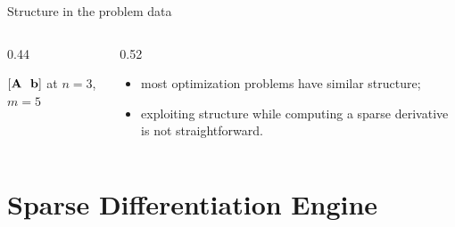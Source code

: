 \documentclass[10pt,mathserif,aspectratio=169]{beamer}
\newcommand{\bul}{\setlength\itemsep{1.1ex}}
\begin{document}
\begin{frame}{Structure in the problem data}
\begin{columns}[c,onlytextwidth]
\begin{column}{0.44\textwidth}
{\vspace{0.5ex}
{\footnotesize $[\mathbf{A}\ \ \mathbf{b}]$ at $n = 3$, $m = 5$}
\par}
\end{column}
\begin{column}{0.52\textwidth}
\begin{itemize}\small\bul
  \item most optimization problems have similar structure;
  \item exploiting structure while computing a sparse derivative is not straightforward.
\end{itemize}
\end{column}
\end{columns}
\end{frame}

\section{Sparse Differentiation Engine}
\end{document}
